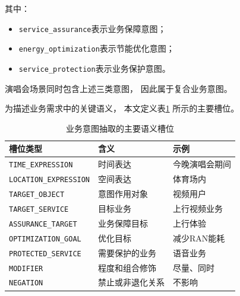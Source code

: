 \documentclass[lang=cn,12pt]{elegantbook}
\begin{document}
其中：

\begin{itemize}
    \item \texttt{service\_assurance}表示业务保障意图；
    \item \texttt{energy\_optimization}表示节能优化意图；
    \item \texttt{service\_protection}表示业务保护意图。
\end{itemize}

演唱会场景同时包含上述三类意图，
因此属于复合业务意图。

为描述业务需求中的关键语义，
本文定义表\ref{tab:intent_slots_reduced}
所示的主要槽位。

\begin{table}[H]
    \centering
    \caption{业务意图抽取的主要语义槽位}
    \label{tab:intent_slots_reduced}
    \small
    \renewcommand{\arraystretch}{1.25}
    \begin{tabularx}{\textwidth}{
        >{\raggedright\arraybackslash}p{}
        >{\raggedright\arraybackslash}p{}
        >{\raggedright\arraybackslash}X
    }
        \toprule
        槽位类型 & 含义 & 示例 \\
        \midrule

        \texttt{TIME\_EXPRESSION}
        & 时间表达
        & 今晚演唱会期间
        \\

        \texttt{LOCATION\_EXPRESSION}
        & 空间表达
        & 体育场内
        \\

        \texttt{TARGET\_OBJECT}
        & 意图作用对象
        & 视频用户
        \\

        \texttt{TARGET\_SERVICE}
        & 目标业务
        & 上行视频业务
        \\

        \texttt{ASSURANCE\_TARGET}
        & 业务保障目标
        & 上行体验
        \\

        \texttt{OPTIMIZATION\_GOAL}
        & 优化目标
        & 减少RAN能耗
        \\

        \texttt{PROTECTED\_SERVICE}
        & 需要保护的业务
        & 语音业务
        \\

        \texttt{MODIFIER}
        & 程度和组合修饰
        & 尽量、同时
        \\

        \texttt{NEGATION}
        & 禁止或非退化关系
        & 不影响
        \\

        \bottomrule
    \end{tabularx}
\end{table}
\end{document}
